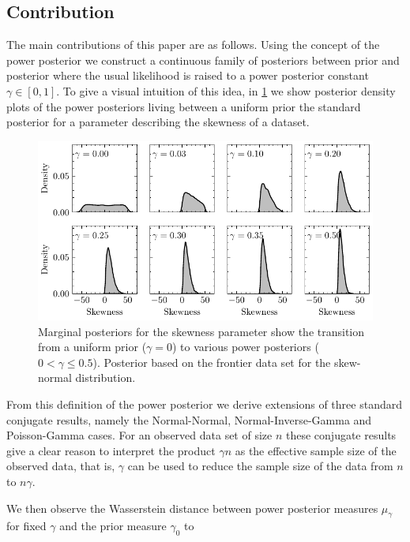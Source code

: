 \documentclass[12pt]{article}
\begin{document}
\subsection{Contribution}

The main contributions of this paper are as follows. Using the concept of the
power posterior we construct a continuous family of posteriors between prior
and posterior where the usual likelihood is raised to a power posterior constant
$\gamma \in [0, 1]$. To give a visual intuition of this idea, in
\cref{fig:skew_normal_powpos} we show posterior density plots of the power
posteriors living between a uniform prior the standard posterior for a parameter
describing the skewness of a dataset.

\begin{figure}
\begin{center}
\includegraphics{imgs/uniform_pow.pdf}
\end{center}
\caption{Marginal posteriors for the skewness parameter show the transition
	from a uniform prior ($\gamma=0$) to various power posteriors
	($0 < \gamma \leq 0.5$). Posterior based on the frontier data set for the
	skew-normal distribution.}\label{fig:skew_normal_powpos}
\end{figure}

From this definition of the power posterior we derive extensions of three standard
conjugate results, namely the Normal-Normal, Normal-Inverse-Gamma and
Poisson-Gamma cases. For an observed data set of size $n$ these conjugate
results give a clear reason to interpret the product $\gamma n$ as the
effective sample size of the observed data, that is, $\gamma$ can be used to
reduce the sample size of the data from $n$ to $n\gamma$.

We then observe the Wasserstein distance between power posterior measures
$\mu_{\gamma}$ for fixed $\gamma$ and the prior measure $\gamma_0$ to  
\end{document}
